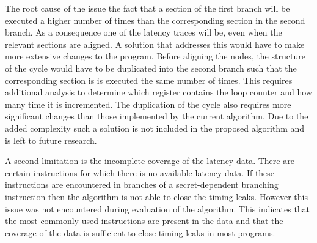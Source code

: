 The root cause of the issue the fact that a section of the first branch will be executed a higher number of times than the corresponding section in the second branch. 
As a consequence one of the latency traces will be, even when the relevant sections are aligned.
A solution that addresses this would have to make more extensive changes to the program. 
Before aligning the nodes, the structure of the cycle would have to be duplicated into the second branch such that the corresponding section is is executed the same number of times. 
This requires additional analysis to determine which register contains the loop counter and how many time it is incremented. 
The duplication of the cycle also requires more significant changes than those implemented by the current algorithm. %
Due to the added complexity such a solution is not included in the proposed algorithm and is left to future research. 

A second limitation is the incomplete coverage of the latency data. There are certain instructions for which there is no available latency data. 
If these instructions are encountered in branches of  a secret-dependent branching instruction then the algorithm is not able to close the timing leaks. 
However this issue was not encountered during evaluation of the algorithm. 
This indicates that the most commonly used instructions are present in the data and that the coverage of the data is sufficient to close timing leaks in most programs. 
